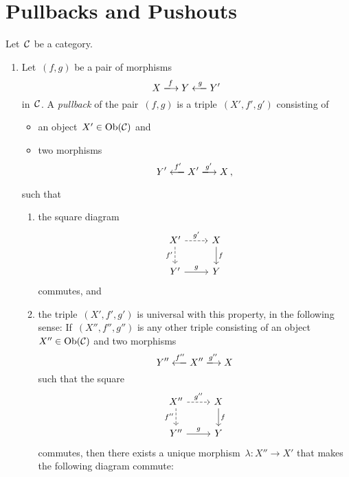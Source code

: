 \section{Pullbacks and Pushouts}


\begin{definition*}
  Let~$\mathcal{C}$ be a category.
  \begin{enumerate}
    \item
      Let~$(f,g)$ be a pair of morphisms
      \[
        X \xlongto{f} Y \xlongfrom{g} Y'
      \]
      in~$\mathcal{C}$.
      A \emph{pullback} of the pair~$(f,g)$ is a triple~$(X', f', g')$ consisting of
      \begin{itemize}
        \item
          an object~$X' \in \operatorname{Ob}(\mathcal{C})$ and
        \item
          two morphisms
          \[
            Y' \xlongfrom{f'} X' \xlongto{g'} X \,,
          \]
      \end{itemize}
      such that
      \begin{enumerate}[label=(PB\arabic*)]
        \item
          the square diagram
          \[
            \begin{tikzcd}
                X'
                \arrow[dashed]{r}[above]{g'}
                \arrow[dashed]{d}[left]{f'}
              & X
                \arrow{d}[right]{f}
              \\
                Y'
                \arrow{r}[above]{g}
              & Y
            \end{tikzcd}
          \]
          commutes, and
        \item
          the triple~$(X', f', g')$ is universal with this property, in the following sense:
          If~$(X'', f'', g'')$ is any other triple consisting of an object~$X'' \in \operatorname{Ob}(\mathcal{C})$ and two morphisms
          \[
            Y'' \xlongfrom{f''} X'' \xlongto{g''} X
          \]
          such that the square
          \[
            \begin{tikzcd}
                X''
                \arrow[dashed]{r}[above]{g''}
                \arrow[dashed]{d}[left]{f''}
              & X
                \arrow{d}[right]{f}
              \\
                Y''
                \arrow{r}[above]{g}
              & Y
            \end{tikzcd}
          \]
          commutes, then there exists a unique morphism~$\lambda \colon X'' \to X'$ that makes the following diagram commute:

\end{enumerate}
\end{enumerate}
\end{definition*}
